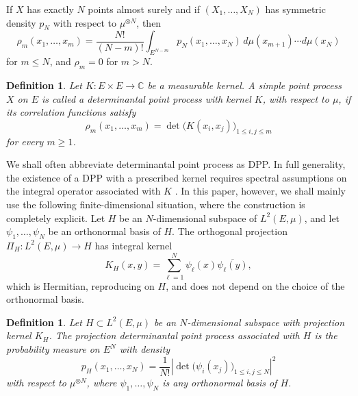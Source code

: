 \documentclass[12pt,a4paper,reqno]{article}
\theoremstyle{thmstyleone}
\theoremstyle{thmstylethree}
\newtheorem{definition}[theorem]{Definition}
\theoremstyle{thmstyletwo}
\numberwithin{equation}{subsection}
\def\geq{\geqslant}
\def\leq{\leqslant}
\begin{document}
If $X$ has exactly $N$ points almost surely and if $(X_1,\ldots,X_N)$ has symmetric density $p_N$ with respect to $\mu^{\otimes N}$, then
\[
    \rho_m(x_1,\ldots,x_m)=\frac{N!}{(N-m)!}\int_{E^{N-m}}p_N(x_1,\ldots,x_N)\,d\mu(x_{m+1})\cdots d\mu(x_N)
\]
for $m\leq N$, and $\rho_m=0$ for $m>N$.

\begin{definition}
Let $K:E\times E\to \mathbb C$ be a measurable kernel. A simple point process $X$ on $E$ is called a \emph{determinantal point process} with kernel $K$, with respect to $\mu$, if its correlation functions satisfy
\begin{equation}
\rho_m(x_1,\ldots,x_m)=\det\big(K(x_i,x_j)\big)_{1\leq i,j\leq m}
\end{equation}
for every $m\geq 1$.
\end{definition}
We shall often abbreviate determinantal point process as DPP. In full generality, the existence of a DPP with a prescribed kernel requires spectral assumptions on the integral operator associated with $K$ \cite{Sos}. In this paper, however, we shall mainly use the following finite-dimensional situation, where the construction is completely explicit. Let $H$ be an $N$-dimensional subspace of $L^2(E,\mu)$, and let $\psi_1,\ldots,\psi_N$ be an orthonormal basis of $H$. The orthogonal projection $\Pi_H:L^2(E,\mu)\longrightarrow H$ has integral kernel
\[
    K_H(x,y)
    =
    \sum_{\ell=1}^N \psi_\ell(x)\overline{\psi_\ell(y)},
\]
which is Hermitian, reproducing on $H$, and does not depend on the choice of the orthonormal basis.

\begin{definition}\label{def:projection-DPP}
Let $H\subset L^2(E,\mu)$ be an $N$-dimensional subspace with projection kernel $K_H$. The \emph{projection determinantal point process} associated with $H$ is the probability measure on $E^N$ with density
\[
    p_H(x_1,\ldots,x_N)=\frac{1}{N!}\left|\det\big(\psi_i(x_j)\big)_{1\leq i,j\leq N}\right|^2
\]
with respect to $\mu^{\otimes N}$, where $\psi_1,\ldots,\psi_N$ is any orthonormal basis of $H$.
\end{definition}
\end{document}

